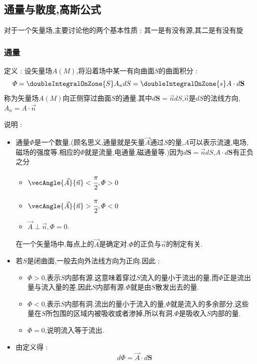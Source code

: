 {{{  }%

  \subsection{通量与散度,高斯公式}{
    对于一个矢量场,主要讨论他的两个基本性质 : 其一是有没有源,其二是有没有旋

    \subsubsection{通量}{
      定义 : 设矢量场$A(M)$,将沿着场中某一有向曲面$S$的曲面积分 :
      $$
        \varPhi = \doubleIntegralOnZone{S} A_n dS = \doubleIntegralOnZone{s} A \cdot d\mathbf{S}
      $$
      称为矢量场$A(M)$向正侧穿过曲面$S$的通量.其中$d\mathbf{S} = \vec{n}dS$,$\vec{n}$是$dS$的法线方向,$A_n = A \cdot \vec{n}$

      说明 :
      \begin{itemize}
        \item {通量$\varPhi$是一个数量.(顾名思义,通量就是矢量$\vec{A}$通过$S$的量,$A$可以表示流速,电场,磁场的强度等.相应的$\varPhi$就是流量,电通量,磁通量等.)因为$d\mathbf{S} = \vec{n}dS$,$A\cdot d\mathbf{S}$有正负之分

              \begin{itemize}
                \item $\vecAngle{\vec{A}}{\vec{n}} < \cfrac{\pi}{2},\varPhi > 0$
                \item $\vecAngle{\vec{A}}{\vec{n}} > \cfrac{\pi}{2},\varPhi < 0$
                \item $\vec{A} \perp \vec{n},\varPhi = 0$.
              \end{itemize}

              在一个矢量场中,每点上的$\vec{A}$是确定对.$\varPhi$的正负与$\vec{n}$的制定有关.
              }
        \item {
              若$S$是闭曲面,一般去向外法线方向为正向.因此 :

              \begin{itemize}
                \item $\varPhi > 0$,表示$S$内部有源.这意味着穿过$S$流入的量小于流出的量,而$\varPhi$正是流出量与流入量的差,因此$S$内部有源.$\varPhi$就是由$S$散发出去的量.
                \item $\varPhi < 0$,表示$S$内部有洞.流出的量小于流入的量,$\varPhi$就是流入的多余部分,这些量在$S$所包围的区域内被吸收或者渗掉,所以有洞.$\varPhi$是吸收入$S$内部的量.
                \item $\varPhi = 0$,说明流入等于流出.
              \end{itemize}
              }
        \item {
              由定义得 :
              $$
                d\varPhi = \vec{A} \cdot d\mathbf{S}
              $$

}
\end{itemize}}}}}
